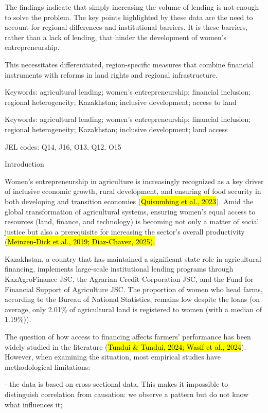 \documentclass[
]{article}
\begin{document}
The findings indicate that simply increasing the volume of lending is
not enough to solve the problem. The key points highlighted by these
data are the need to account for regional differences and institutional
barriers. It is these barriers, rather than a lack of lending, that
hinder the development of women's entrepreneurship.

This necessitates differentiated, region-specific measures that combine
financial instruments with reforms in land rights and regional
infrastructure.

Keywords: agricultural lending; women's entrepreneurship; financial
inclusion; regional heterogeneity; Kazakhstan; inclusive development;
access to land

Keywords: agricultural lending; women's entrepreneurship; financial
inclusion; regional heterogeneity; Kazakhstan; inclusive development;
land access

JEL codes: Q14, J16, O13, Q12, O15

Introduction

Women's entrepreneurship in agriculture is increasingly recognized as a
key driver of inclusive economic growth, rural development, and ensuring
of food security in both developing and transition economies
(\hl{Quisumbing et al., 2023}). Amid the global transformation of
agricultural systems, ensuring women's equal access to resources (land,
finance, and technology) is becoming not only a matter of social justice
but also a prerequisite for increasing the sector's overall productivity
(\hl{Meinzen-Dick et al., 2019; Diaz-Chavez, 2025).}

Kazakhstan, a country that has maintained a significant state role in
agricultural financing, implements large-scale institutional lending
programs through KazAgroFinance JSC, the Agrarian Credit Corporation
JSC, and the Fund for Financial Support of Agriculture JSC. The
proportion of women who head farms, according to the Bureau of National
Statistics, remains low despite the loans (on average, only 2.01\% of
agricultural land is registered to women (with a median of 1.19\%)).

The question of how access to financing affects farmers' performance has
been widely studied in the literature (\hl{Tundui \& Tundui, 2024; Wasif
et al., 2024}). However, when examining the situation, most empirical
studies have methodological limitations:

- the data is based on cross-sectional data. This makes it impossible to
distinguish correlation from causation: we observe a pattern but do not
know what influences it;
\end{document}
